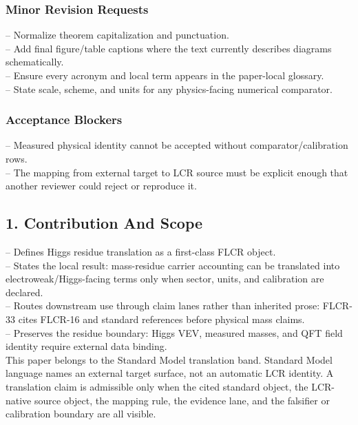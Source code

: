 \documentclass[11pt]{article}
\begin{document}
\subsubsection*{Minor Revision Requests}

\noindent{}-- Normalize theorem capitalization and punctuation.\\
\noindent{}-- Add final figure/table captions where the text currently describes diagrams schematically.\\
\noindent{}-- Ensure every acronym and local term appears in the paper-local glossary.\\
\noindent{}-- State scale, scheme, and units for any physics-facing numerical comparator.\\

\subsubsection*{Acceptance Blockers}

\noindent{}-- Measured physical identity cannot be accepted without comparator/calibration rows.\\
\noindent{}-- The mapping from external target to LCR source must be explicit enough that another reviewer could reject or reproduce it.\\


\subsection*{1. Contribution And Scope}

\noindent{}-- Defines Higgs residue translation as a first-class FLCR object.\\
\noindent{}-- States the local result: mass-residue carrier accounting can be translated into electroweak/Higgs-facing terms only when sector, units, and calibration are declared.\\
\noindent{}-- Routes downstream use through claim lanes rather than inherited prose: FLCR-33 cites FLCR-16 and standard references before physical mass claims.\\
\noindent{}-- Preserves the residue boundary: Higgs VEV, measured masses, and QFT field identity require external data binding.\\

This paper belongs to the Standard Model translation band. Standard Model language names an external target surface, not an automatic LCR identity. A translation claim is admissible only when the cited standard object, the LCR-native source object, the mapping rule, the evidence lane, and the falsifier or calibration boundary are all visible.
\end{document}
